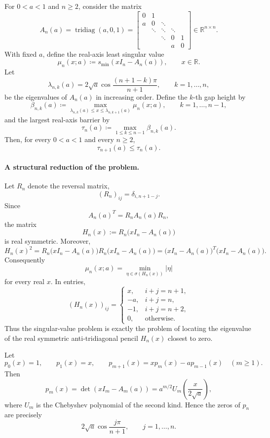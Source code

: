 \documentclass[11pt]{article}
\title{}
\author{}
\date{}
\begin{document}
\maketitle

For \(0<a<1\) and \(n\ge2\), consider the matrix
\[
A_n(a)
=
\operatorname{tridiag}(a,0,1)
=
\begin{bmatrix}
0 & 1 \\
a & 0 & \ddots \\
& \ddots & \ddots & \ddots \\
&& \ddots & 0 & 1 \\
&&& a & 0
\end{bmatrix}\in \mathbb{R}^{n\times n}.
\]
With fixed \(a\), define the real-axis least singular value
\[
\mu_n(x;a)\coloneqq s_{\min}(xI_n-A_n(a)),
\qquad x\in\mathbb{R}.
\]
Let
\[
\lambda_{n,k}(a)
=
2\sqrt a\cos\frac{(n+1-k)\pi}{n+1},
\qquad k=1,\dots,n,
\]
be the eigenvalues of \(A_n(a)\) in increasing order.
Define the \(k\)-th gap height by
\[
\beta_{n,k}(a)
\coloneqq
\max_{\lambda_{n,k}(a)\le x\le\lambda_{n,k+1}(a)}
\mu_n(x;a),
\qquad k=1,\dots,n-1,
\]
and the largest real-axis barrier by
\[
\tau_n(a)\coloneqq\max_{1\le k\le n-1}\beta_{n,k}(a).
\]
Then, for every \(0<a<1\) and every \(n\ge2\),
\[
\tau_{n+1}(a)\le\tau_n(a).
\]

\paragraph{A structural reduction of the problem.}
Let \(R_n\) denote the reversal matrix,
\[
(R_n)_{ij}=\delta_{i,n+1-j}.
\]
Since
\[
A_n(a)^T=R_nA_n(a)R_n,
\]
the matrix
\[
H_n(x):=R_n\bigl(xI_n-A_n(a)\bigr)
\]
is real symmetric. Moreover,
\[
H_n(x)^2
=
R_n\bigl(xI_n-A_n(a)\bigr)R_n\bigl(xI_n-A_n(a)\bigr)
=
\bigl(xI_n-A_n(a)\bigr)^T\bigl(xI_n-A_n(a)\bigr).
\]
Consequently
\[
\boxed{\;
\mu_n(x;a)
=
\min_{\eta\in\sigma(H_n(x))}|\eta|
\;}
\tag{1}
\]
for every real \(x\). In entries,
\[
(H_n(x))_{ij}
=
\begin{cases}
x, & i+j=n+1,\\
-a, & i+j=n,\\
-1, & i+j=n+2,\\
0, & \text{otherwise}.
\end{cases}
\tag{2}
\]
Thus the singular-value problem is exactly the problem of locating the eigenvalue of the real symmetric anti-tridiagonal pencil \(H_n(x)\) closest to zero.

Let
\[
p_0(x)=1,\qquad p_1(x)=x,\qquad
p_{m+1}(x)=xp_m(x)-ap_{m-1}(x)\quad(m\ge1).
\]
Then
\[
p_m(x)=\det(xI_m-A_m(a))
=
a^{m/2}U_m\!\left(\frac{x}{2\sqrt a}\right),
\tag{3}
\]
where \(U_m\) is the Chebyshev polynomial of the second kind. Hence the zeros of \(p_n\) are precisely
\[
2\sqrt a\cos\frac{j\pi}{n+1},\qquad j=1,\dots,n.
\]
\end{document}
